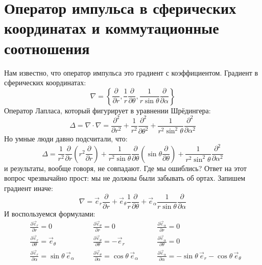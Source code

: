 \section{Оператор импульса в сферических координатах и коммутационные соотношения}

Нам известно, что оператор импульса это градиент с коэффициентом. Градиент в сферических координатах:
\[
	\nabla = \left\{\frac{\partial}{\partial r}, \frac{1}{r}\frac{\partial}{\partial \theta}, \frac{1}{r \sin \theta}\frac{\partial}{\partial \alpha} \right\}
\]
Оператор Лапласа, который фигурирует в уравнении Шрёдингера:
\[
	\Delta = \nabla \cdot \nabla = \frac{\partial^2}{\partial r^2} + \frac{1}{r^2}\frac{\partial^2}{\partial \theta^2} +\frac{1}{r^2 \sin^2 \theta}\frac{\partial^2}{\partial \alpha^2}
\]
Но умные люди давно подсчитали, что:
\[
	\Delta = 
	\frac{1}{r^2}\frac{\partial}{\partial r} \left(r^2 \frac{\partial}{\partial r}\right)
	+ \frac{1}{r^2 \sin \theta} \frac{\partial}{\partial \theta} \left(\sin \theta \frac{\partial}{\partial \theta}\right)
	+ \frac{1}{r^2 \sin^2 \theta} \frac{\partial^2}{\partial \alpha^2}
\]
и результаты, вообще говоря, не совпадают. Где мы ошиблись? Ответ на этот вопрос чрезвычайно прост: мы не должны были забывать об ортах. Запишем градиент иначе:
\[
	\nabla = \vec{e}_r \frac{\partial}{\partial r} + \vec{e}_\theta \frac{1}{r}\frac{\partial}{\partial \theta} + \vec{e}_\alpha \frac{1}{r \sin \theta}\frac{\partial}{\partial \alpha}
\]
И воспользуемся формулами:
\[
\begin{aligned}
& \frac{\partial \vec{e}_r}{\partial r} = 0 \\
& \frac{\partial \vec{e}_r}{\partial \theta} = \vec{e}_\theta \\
& \frac{\partial \vec{e}_r}{\partial \alpha} = \sin \theta\, \vec{e}_\alpha
\end{aligned}
\quad
\begin{aligned}
& \frac{\partial \vec{e}_\theta}{\partial r} = 0 \\
& \frac{\partial \vec{e}_\theta}{\partial \theta} = -\vec{e}_r \\
& \frac{\partial \vec{e}_\theta}{\partial \alpha} = \cos \theta\, \vec{e}_\alpha
\end{aligned}
\quad
\begin{aligned}
& \frac{\partial \vec{e}_\alpha}{\partial r} = 0 \\
& \frac{\partial \vec{e}_\alpha}{\partial \theta} = 0 \\
& \frac{\partial \vec{e}_\alpha}{\partial \alpha} = -\sin\theta \, \vec{e}_r -\cos \theta\, \vec{e}_\theta
\end{aligned}
\]
